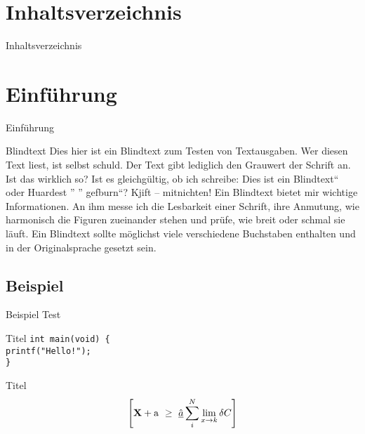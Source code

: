 \documentclass[aspectratio=169, 12pt, mathserif]{beamer}
\title[Generierung einer Client-Bibliothek aus einer WebService Beschr.]{\thesisTitle{}}
\subtitle{Bachelorverteidigung}
\author[A. Linz]{Andreas Linz}
\institute[]{\thesisUniversity{} - \thesisUniversityDepartment}
\date{\today}
\begin{document}
    \begin{frame}[plain]
        \titlepage
    \end{frame} 
    
    \section{Inhaltsverzeichnis}
    \begin{frame}{Inhaltsverzeichnis}
        \tableofcontents
    \end{frame}

    \section{Einführung}
    \begin{frame}{Einführung}
        \begin{block}{Blindtext}
            Dies hier ist ein Blindtext zum Testen von Textausgaben. Wer
diesen Text liest, ist selbst schuld. Der Text gibt lediglich den
Grauwert der Schrift an. Ist das wirklich so? Ist es gleichgültig,
ob ich schreibe: Dies ist ein Blindtext“ oder Huardest
”
”
gefburn“? Kjift -- mitnichten! Ein Blindtext bietet mir wichtige
Informationen. An ihm messe ich die Lesbarkeit einer Schrift,
ihre Anmutung, wie harmonisch die Figuren zueinander stehen
und prüfe, wie breit oder schmal sie läuft. Ein Blindtext sollte
möglichst viele verschiedene Buchstaben enthalten und in der
Originalsprache gesetzt sein.
        \end{block}
    \end{frame}

    \subsection{Beispiel}
    \begin{frame}{Beispiel}
        Test
        \begin{exampleblock}{Titel}
            \texttt{int main(void) \{}\\
            \texttt{printf("Hello!");}\\
            \texttt{\}}
        \end{exampleblock}
        \begin{alertblock}{Titel}
            \begin{equation}
            \left[
            {\bf X} + {\rm a} \ \geq\ 
            \underline{\hat a} \sum_i^N \lim_{x \rightarrow k} \delta C
            \right]
            \end{equation}
        \end{alertblock}
    \end{frame}
\end{document}
